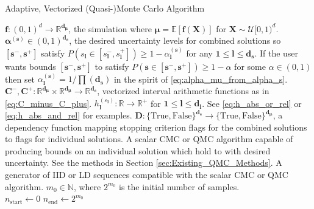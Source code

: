 \documentclass[graybox]{svmult}
\begin{document}
\begin{algorithm}[t]
    \caption{Adaptive, Vectorized (Quasi-)Monte Carlo Algorithm}
    \label{algo:MCStoppingCriterion}
    \begin{algorithmic}
    \Require $\boldsymbol{f}: (0,1)^d \to \mathbb{R}^{\boldsymbol{d}_{\boldsymbol{\mu}}}$, the simulation where $\boldsymbol{\mu} = \mathbb{E}[\boldsymbol{f}(\boldsymbol{X})]$ for $\boldsymbol{X} \sim \mathcal{U}[0,1)^d$.
    \Require $\boldsymbol{\alpha}^{(\boldsymbol{s})} \in (0,1)^{\boldsymbol{d}_{\boldsymbol{s}}}$, the desired uncertainty levels for combined solutions so $[\boldsymbol{s}^-,\boldsymbol{s}^+]$ satisfy $P(s_{\boldsymbol{l}} \in [s_{\boldsymbol{l}}^-,s_{\boldsymbol{l}}^+]) \geq 1-\alpha^{(\boldsymbol{s})}_{\boldsymbol{l}}$ for any $\boldsymbol{1} \leq \boldsymbol{l} \leq \boldsymbol{d}_{\boldsymbol{s}}$. If the user wants bounds $[\boldsymbol{s}^-,\boldsymbol{s}^+]$ to satisfy $P(\boldsymbol{s} \in [\boldsymbol{s}^-,\boldsymbol{s}^+]) \geq 1-\alpha$ for some $\alpha \in (0,1)$ then set $\alpha_{\boldsymbol{l}}^{(\boldsymbol{s})} = 1/\prod(\boldsymbol{d}_{\boldsymbol{s}})$ in the spirit of \eqref{eq:alpha_mu_from_alpha_s}.
    \Require $\boldsymbol{C}^-,\boldsymbol{C}^+: \mathbb{R}^{\boldsymbol{d}_{\boldsymbol{\mu}}} \times \mathbb{R}^{\boldsymbol{d}_{\boldsymbol{\mu}}} \to \mathbb{R}^{\boldsymbol{d}_{\boldsymbol{s}}}$, vectorized interval arithmetic functions as in \eqref{eq:C_minus_C_plus}.%
    \Require $h^{(\varepsilon_{\boldsymbol{l}})}_{\boldsymbol{l}}: \mathbb{R} \to \mathbb{R}^+$ for $\boldsymbol{1} \leq \boldsymbol{l} \leq \boldsymbol{d}_{\boldsymbol{l}}$. See \eqref{eq:h_abs_or_rel} or \eqref{eq:h_abs_and_rel} for examples.
    \Require $\boldsymbol{D}: \{\text{True},\text{False}\}^{\boldsymbol{d}_{\boldsymbol{s}}} \to \{\text{True},\text{False}\}^{\boldsymbol{d}_{\boldsymbol{\mu}}}$, a dependency function mapping stopping criterion flags for the combined solutions to flags for individual solutions. 
    \Require A scalar CMC or QMC algorithm capable of producing bounds on an individual solution which hold to with desired uncertainty. See the methods in Section \ref{sec:Existing_QMC_Methods}.
    \Require A generator of IID or LD sequences compatible with the scalar CMC or QMC algorithm. 
    \Require $m_0 \in \mathbb{N}$, where $2^{m_0}$ is the initial number of samples.
    \\ \hrulefill
    \State $n_\text{start} \gets 0$ 
    \State $n_\text{end} \gets 2^{m_0}$ 

\end{algorithmic}
\end{algorithm}
\end{document}
